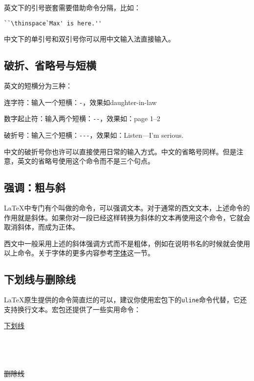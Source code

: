 英文下的引号嵌套需要借助命令分隔，比如：
\begin{verbatim}
``\thinspace`Max' is here.''
\end{verbatim}

中文下的单引号和双引号你可以用中文输入法直接输入。

\subsection{破折、省略号与短横}
英文的短横分为三种：
\begin{feai}
\item 连字符：输入一个短横：\verb|-|，效果如daughter-in-law
\item 数字起止符：输入两个短横：\verb|--|，效果如：page 1--2
\item 破折号：输入三个短横：\verb|---|，效果如：Listen---I'm serious.
\end{feai}

中文的破折号你也许可以直接使用日常的输入方式。中文的省略号同样。但是注意，英文的省略号使用这个命令而不是三个句点。

\subsection{强调：粗与斜}
\LaTeX 中专门有个叫做的命令，可以强调文本。对于通常的西文文本，上述命令的作用就是斜体。如果你对一段已经这样转换为斜体的文本再使用这个命令，它就会取消斜体，而成为正体。

西文中一般采用上述的斜体强调方式而不是粗体，例如在说明书名的时候就会使用以上命令。关于字体的更多内容参考\hyperref[sec:font]{字体}这一节。

\subsection{下划线与删除线}
\LaTeX 原生提供的命令简直烂的可以，建议你使用宏包下的\texttt{uline}命令代替，它还支持换行文本。宏包还提供了一些实用命令：

\begin{codeshow}
\uline{下划线} \\
 \\
 \\
 \\
 \\
\sout{删除线} \\
\end{codeshow}

